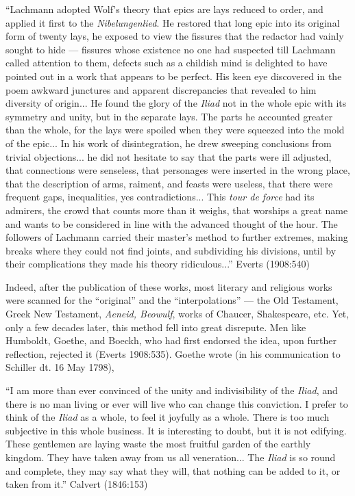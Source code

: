 \begin{myquote}
“Lachmann adopted Wolf’s theory that epics are lays reduced to order, and applied it first to the {\sl Nibelungenlied}. He restored that long epic into its original form of twenty lays, he exposed to view the fissures that the redactor had vainly sought to hide --- fissures whose existence no one had suspected till Lachmann called attention to them, defects such as a childish mind is delighted to have pointed out in a work that appears to be perfect. His keen eye discovered in the poem awkward junctures and apparent discrepancies that revealed to him diversity of origin... He found the glory of the {\sl Iliad} not in the whole epic with its symmetry and unity, but in the separate lays. The parts he accounted greater than the whole, for the lays were spoiled when they were squeezed into the mold of the epic...  In his work of disintegration, he drew sweeping conclusions from trivial objections... he did not hesitate to say that the parts were ill adjusted, that connections were senseless, that personages were inserted in the wrong place, that the description of arms, raiment, and feasts were useless, that there were frequent gaps, inequalities, yes contradictions...  This {\sl tour de force} had its admirers, the crowd that counts more than it weighs, that worships a great name and wants to be considered in line with the advanced thought of the hour. The followers of Lachmann carried their master's method to further extremes, making breaks where they could not find joints, and subdividing his divisions, until by their complications they made his theory ridiculous...”
\hfill Everts (1908:540)
\end{myquote}

Indeed, after the publication of these works, most literary and religious works were scanned for the “original” and the “interpolations” --- the Old Testament, Greek New Testament, {\sl Aeneid, Beowulf}, works of Chaucer, Shakespeare, etc. Yet, only a few decades later, this method fell into great disrepute. Men like Humboldt, Goethe, and Boeckh, who had first endorsed the idea, upon further reflection, rejected it (Everts 1908:535). Goethe wrote (in his communication to Schiller dt. 16 May 1798),

\begin{myquote}
“I am more than ever convinced of the unity and indivisibility of the {\sl Iliad}, and there is no man living or ever will live who can change this conviction. I prefer to think of the {\sl Iliad} as a whole, to feel it joyfully as a whole. There is too much subjective in this whole business. It is interesting to doubt, but it is not edifying. These gentlemen are laying waste the most fruitful garden of the earthly kingdom. They have taken away from us all veneration... The {\sl Iliad} is so round and complete, they may say what they will, that nothing can be added to it, or taken from it.”
\hfill Calvert (1846:153)
\end{myquote}

